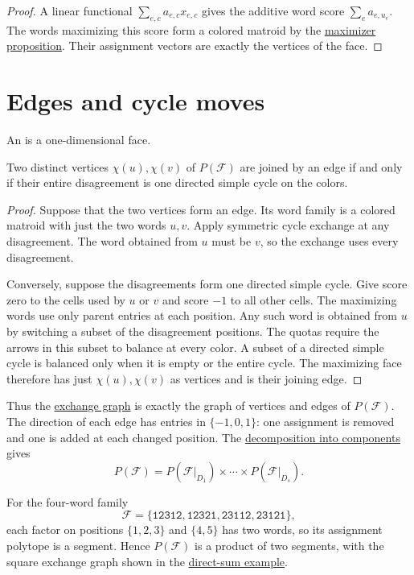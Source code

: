 \begin{proof}
A linear functional $\sum_{e,c}a_{e,c}x_{e,c}$ gives the additive word score
$\sum_e a_{e,u_e}$. The words maximizing this score form a colored matroid
by the \href{operations.htm#scoreMaximizers}{maximizer proposition}. Their
assignment vectors are exactly the vertices of the face.
\end{proof}

\section[polytopeEdges]{Edges and cycle moves}

An  is a one-dimensional face.

\begin{theorem}
Two distinct vertices $\chi(u),\chi(v)$ of $P(\mathcal F)$ are joined by an
edge if and only if their entire disagreement is one directed simple cycle
on the colors.
\end{theorem}

\begin{proof}
Suppose that the two vertices form an edge. Its word family is a colored
matroid with just the two words $u,v$. Apply symmetric cycle exchange at any
disagreement. The word obtained from $u$ must be $v$, so the exchange uses
every disagreement.

Conversely, suppose the disagreements form one directed simple cycle. Give
score zero to the cells used by $u$ or $v$ and score $-1$ to all other cells.
The maximizing words use only parent entries at each position. Any such word
is obtained from $u$ by switching a subset of the disagreement positions.
The quotas require the arrows in this subset to balance at every color.
A subset of a directed simple cycle is balanced only when it is empty or
the entire cycle. The maximizing face therefore has just $\chi(u),\chi(v)$
as vertices and is their joining edge.
\end{proof}

Thus the \href{exchange-graphs.htm}{exchange graph} is exactly the graph of
vertices and edges of $P(\mathcal F)$. The direction of each edge has entries
in $\{-1,0,1\}$: one assignment is removed and one is added at each changed
position. The
\href{exchange-graphs.htm#components}{decomposition into components} gives
\[
 P(\mathcal F)=P(\mathcal F|_{D_1})\times\dotsm\times
 P(\mathcal F|_{D_s}).
\]

\begin{example}[A square]
For the four-word family
\[
 \mathcal F=\{\mathtt{12312},\mathtt{12321},
             \mathtt{23112},\mathtt{23121}\},
\]
each factor on positions $\{1,2,3\}$ and $\{4,5\}$ has two words, so its
assignment polytope is a segment. Hence $P(\mathcal F)$ is a product of two
segments, with the square exchange graph shown in the
\href{exchange-graphs.htm#directSumGraphs}{direct-sum example}.
\end{example}

